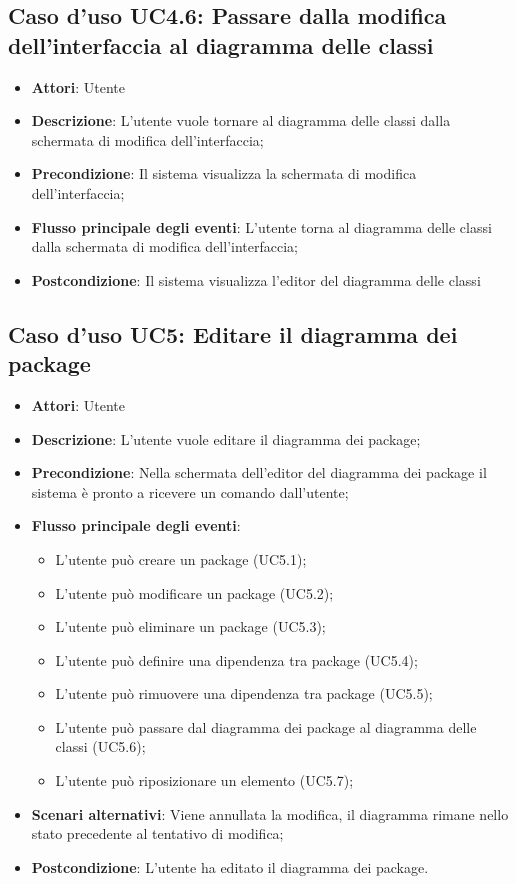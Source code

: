 \documentclass[../AnalisiDeiRequisiti.tex]{subfiles}
\begin{document}
			\subsection{Caso d'uso UC4.6: Passare dalla modifica dell'interfaccia al diagramma delle classi}
			\begin{itemize}
				\item \textbf{Attori}: Utente
				\item \textbf{Descrizione}: L'utente vuole tornare al diagramma delle classi dalla schermata di modifica dell'interfaccia;
				\item \textbf{Precondizione}: Il sistema visualizza la schermata di modifica dell'interfaccia;
				\item \textbf{Flusso principale degli eventi}: L'utente torna al diagramma delle classi dalla schermata di modifica dell'interfaccia;
				\item \textbf{Postcondizione}: Il sistema visualizza l'editor del diagramma delle classi
			\end{itemize}
			\subsection{Caso d'uso UC5: Editare il diagramma dei package}
			\begin{itemize}
				\item \textbf{Attori}: Utente
				\item \textbf{Descrizione}: L'utente vuole editare il diagramma dei package;
				\item \textbf{Precondizione}: Nella schermata dell'editor del diagramma dei package il sistema è pronto a ricevere un comando dall'utente;
				\item \textbf{Flusso principale degli eventi}: \begin{itemize}
					\item L'utente può creare un package (UC5.1);
					\item L'utente può modificare un package (UC5.2);
					\item L'utente può eliminare un package (UC5.3);
					\item L'utente può definire una dipendenza tra package (UC5.4);
					\item L'utente può rimuovere una dipendenza tra package (UC5.5);
					\item L'utente può passare dal diagramma dei package al diagramma delle classi (UC5.6);
					\item L'utente può riposizionare un elemento (UC5.7);
				\end{itemize}
				\item \textbf{Scenari alternativi}: Viene annullata la modifica, il diagramma rimane nello stato precedente al tentativo di modifica;
				\item \textbf{Postcondizione}: L'utente ha editato il diagramma dei package.
			\end{itemize}
\end{document}
